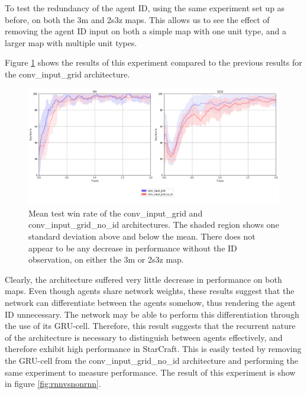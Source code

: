 To test the redundancy of the agent ID, using the same experiment set up as before, on both the 3m and 2s3z maps. This allows us to see the effect of removing the agent ID input on both a simple map with one unit type, and a larger map with multiple unit types.

Figure \ref{fig:noid} shows the results of this experiment compared to the previous results for the conv\_input\_grid architecture.

\begin{figure}
    \centering
    \hbox{\hspace{-6.6em}\includegraphics[scale=0.47]{images/graphs/noid.png}}
    \caption{Mean test win rate of the conv\_input\_grid and conv\_input\_grid\_no\_id architectures. The shaded region shows one standard deviation above and below the mean. There does not appear to be any decrease in performance without the ID observation, on either the 3m or 2s3z map.}
    \label{fig:noid}
\end{figure}


Clearly, the architecture suffered very little decrease in performance on both maps. Even though agents share network weights, these results suggest that the network can differentiate between the agents somehow, thus rendering the agent ID unnecessary. The network may be able to perform this differentiation through the use of its GRU-cell. Therefore, this result suggests that the recurrent nature of the architecture is necessary to distinguish between agents effectively, and therefore exhibit high performance in StarCraft. This is easily tested by removing the GRU-cell from the conv\_input\_grid\_no\_id architecture and performing the same experiment to measure performance. The result of this experiment is show in figure \ref{fig:rnnvsnonrnn}.

